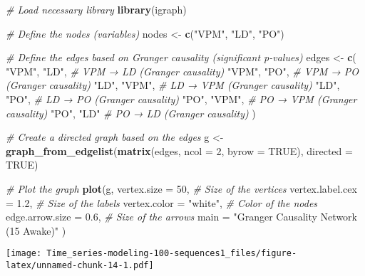 \documentclass[
]{article}
\newenvironment{Shaded}{\begin{snugshade}}{\end{snugshade}}
\newcommand{\AttributeTok}[1]{\textcolor[rgb]{0.13,0.29,0.53}{#1}}
\newcommand{\CommentTok}[1]{\textcolor[rgb]{0.56,0.35,0.01}{\textit{#1}}}
\newcommand{\ConstantTok}[1]{\textcolor[rgb]{0.56,0.35,0.01}{#1}}
\newcommand{\DecValTok}[1]{\textcolor[rgb]{0.00,0.00,0.81}{#1}}
\newcommand{\FloatTok}[1]{\textcolor[rgb]{0.00,0.00,0.81}{#1}}
\newcommand{\FunctionTok}[1]{\textcolor[rgb]{0.13,0.29,0.53}{\textbf{#1}}}
\newcommand{\NormalTok}[1]{#1}
\newcommand{\OtherTok}[1]{\textcolor[rgb]{0.56,0.35,0.01}{#1}}
\newcommand{\StringTok}[1]{\textcolor[rgb]{0.31,0.60,0.02}{#1}}
\begin{document}
\begin{Shaded}
\begin{Highlighting}[]
\CommentTok{\# Load necessary library}
\FunctionTok{library}\NormalTok{(igraph)}

\CommentTok{\# Define the nodes (variables)}
\NormalTok{nodes }\OtherTok{\textless{}{-}} \FunctionTok{c}\NormalTok{(}\StringTok{"VPM"}\NormalTok{, }\StringTok{"LD"}\NormalTok{, }\StringTok{"PO"}\NormalTok{)}

\CommentTok{\# Define the edges based on Granger causality (significant p{-}values)}
\NormalTok{edges }\OtherTok{\textless{}{-}} \FunctionTok{c}\NormalTok{(}
  \StringTok{"VPM"}\NormalTok{, }\StringTok{"LD"}\NormalTok{,  }\CommentTok{\# VPM → LD (Granger causality)}
  \StringTok{"VPM"}\NormalTok{, }\StringTok{"PO"}\NormalTok{,  }\CommentTok{\# VPM → PO (Granger causality)}
  \StringTok{"LD"}\NormalTok{, }\StringTok{"VPM"}\NormalTok{,  }\CommentTok{\# LD → VPM (Granger causality)}
  \StringTok{"LD"}\NormalTok{, }\StringTok{"PO"}\NormalTok{,  }\CommentTok{\# LD → PO (Granger causality)}
  \StringTok{"PO"}\NormalTok{, }\StringTok{"VPM"}\NormalTok{,  }\CommentTok{\# PO → VPM (Granger causality)}
  \StringTok{"PO"}\NormalTok{, }\StringTok{"LD"}   \CommentTok{\# PO → LD (Granger causality)}
\NormalTok{)}

\CommentTok{\# Create a directed graph based on the edges}
\NormalTok{g }\OtherTok{\textless{}{-}} \FunctionTok{graph\_from\_edgelist}\NormalTok{(}\FunctionTok{matrix}\NormalTok{(edges, }\AttributeTok{ncol =} \DecValTok{2}\NormalTok{, }\AttributeTok{byrow =} \ConstantTok{TRUE}\NormalTok{), }\AttributeTok{directed =} \ConstantTok{TRUE}\NormalTok{)}

\CommentTok{\# Plot the graph}
\FunctionTok{plot}\NormalTok{(g,}
     \AttributeTok{vertex.size =} \DecValTok{50}\NormalTok{,                  }\CommentTok{\# Size of the vertices}
     \AttributeTok{vertex.label.cex =} \FloatTok{1.2}\NormalTok{,            }\CommentTok{\# Size of the labels}
     \AttributeTok{vertex.color =} \StringTok{"white"}\NormalTok{,        }\CommentTok{\# Color of the nodes}
     \AttributeTok{edge.arrow.size =} \FloatTok{0.6}\NormalTok{,             }\CommentTok{\# Size of the arrows}
     \AttributeTok{main =} \StringTok{"Granger Causality Network (15 Awake)"}
\NormalTok{)}
\end{Highlighting}
\end{Shaded}

\texttt{[image: Time\_series-modeling-100-sequences1\_files/figure-latex/unnamed-chunk-14-1.pdf]}
\end{document}
